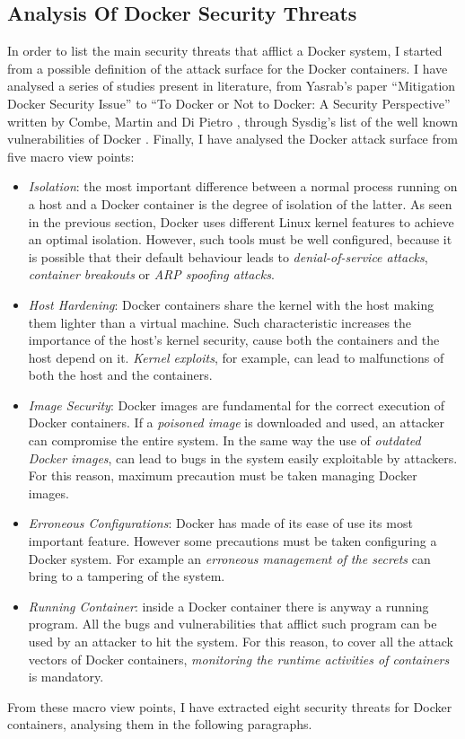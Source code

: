 \documentclass[a4paper,12pt]{article}
\begin{document}
\subsection{Analysis Of Docker Security Threats}

In order to list the main security threats that afflict a Docker system, I
started from a possible definition of the attack surface for the Docker
containers. I have analysed a series of studies present in literature, from
Yasrab's paper ``Mitigation Docker Security
Issue'' \cite{mitigating_docker_security_issues_yasrab} to  ``To Docker or Not to
Docker: A Security Perspective'' written by Combe, Martin and Di
Pietro \cite{to_docker_or_not_to_docker}, through Sysdig's list of the well known
vulnerabilities of Docker \cite{sysdig_docker_vulnerabilities}. Finally, I have
analysed the Docker attack surface from five macro view points:
\begin{itemize}
  \item \textit{Isolation}: the most important difference between a normal
  process running on a host and a Docker container is the degree of isolation of
  the latter. As seen in the previous section, Docker uses different Linux
  kernel features to achieve an optimal isolation. However, such tools must be
  well configured, because it is possible that their default behaviour leads to
  \textit{denial-of-service attacks}, \textit{container breakouts} or
  \textit{ARP spoofing attacks}.
  \item \textit{Host Hardening}: Docker containers share the kernel with the
  host making them lighter than a virtual machine. Such characteristic increases
  the importance of the host's kernel security, cause both the containers and
  the host depend on it. \textit{Kernel exploits}, for example, can lead to
  malfunctions of both the host and the containers. 
  \item \textit{Image Security}: Docker images are fundamental for the correct
  execution of Docker containers. If a \textit{poisoned image} is downloaded and
  used, an attacker can compromise the entire system. In the same way the use of
  \textit{outdated Docker images}, can lead to bugs in the system easily
  exploitable by attackers. For this reason, maximum precaution must be taken
  managing Docker images.
  \item \textit{Erroneous Configurations}: Docker has made of its ease of
  use its most important feature. However some precautions must be taken
  configuring a Docker system. For example an \textit{erroneous management of
  the secrets} can bring to a tampering of the system. 
  \item \textit{Running Container}: inside a Docker container there is anyway
  a running program. All the bugs and vulnerabilities that afflict such program
  can be used by an attacker to hit the system. For this reason, to cover all the
  attack vectors of Docker containers, \textit{monitoring the
  runtime activities of containers} is mandatory.
\end{itemize}
From these macro view points, I have extracted eight security threats for Docker
containers, analysing them in the following paragraphs.
 
\end{document}
